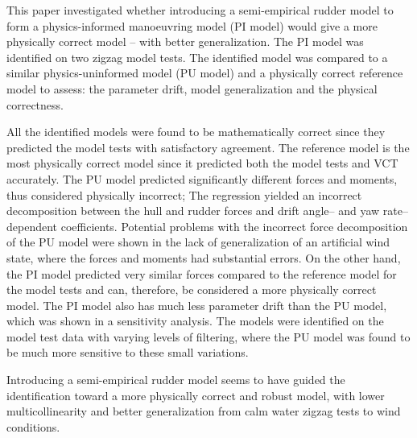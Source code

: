 %
This paper investigated whether introducing a semi-empirical rudder model to form a physics-informed manoeuvring model (PI model) would give a more physically correct model -- with better generalization.
The PI model was identified on two zigzag model tests. The identified model was compared to a similar physics-uninformed model (PU model) and a physically correct reference model to assess: the parameter drift, model generalization and the physical correctness. 

All the identified models were found to be mathematically correct since they predicted the model tests with satisfactory agreement.
The reference model is the most physically correct model since it predicted both the model tests and VCT accurately.
The PU model predicted significantly different forces and moments, thus considered physically incorrect; 
The regression yielded an incorrect decomposition between the hull and rudder forces and drift angle-- and yaw rate--dependent coefficients.
Potential problems with the incorrect force decomposition of the PU model were shown in the lack of generalization of an artificial wind state, where the forces and moments had substantial errors.
On the other hand, the PI model predicted very similar forces compared to the reference model for the model tests and can, therefore, be considered a more physically correct model. 
The PI model also has much less parameter drift than the PU model, which was shown in a sensitivity analysis. The models were identified on the model test data with varying levels of filtering, where the PU model was found to be much more sensitive to these small variations.

Introducing a semi-empirical rudder model seems to have guided the identification toward a more physically correct and robust model, with lower multicollinearity and better generalization from calm water zigzag tests to wind conditions.

